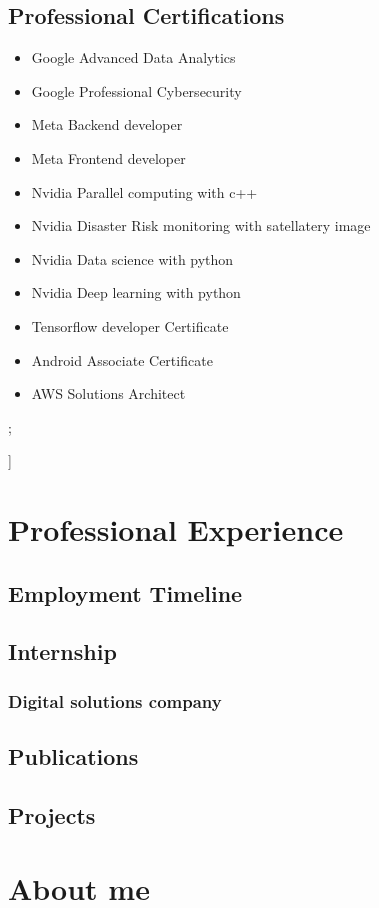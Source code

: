 \documentclass[a4paper,9pt]{article}
\begin{document}
\begin{tcolorbox}
{{{\color{blue}\subsection*{Professional Certifications}}

\begin{itemize}
    \item Google Advanced Data Analytics
    \item Google Professional Cybersecurity
    \item Meta Backend developer
    \item Meta Frontend developer
    \item Nvidia Parallel computing with c++
    \item Nvidia Disaster Risk monitoring with satellatery image
    \item Nvidia Data science with python
    \item Nvidia Deep learning with python
    \item Tensorflow developer Certificate
    \item Android Associate Certificate
    \item AWS Solutions Architect
\end{itemize}


  };}]
\section*{Professional Experience}
\vspace{-2.0mm}
{\color{blue}\subsection*{Employment Timeline}}

\subsection*{Internship}
\vspace{-1.2mm}
\subsubsection*{Digital solutions company}
\lipsum[1]
\vspace{-3.2mm}
{\color{blue}\subsection*{Publications}}
\lipsum[1]

\vspace{-3.2mm}
{\color{blue}\subsection*{Projects}}

\lipsum[1]

\vspace{-3.2mm}
\section*{About me}
\lipsum[1]


\end{tcolorbox}
\end{document}
